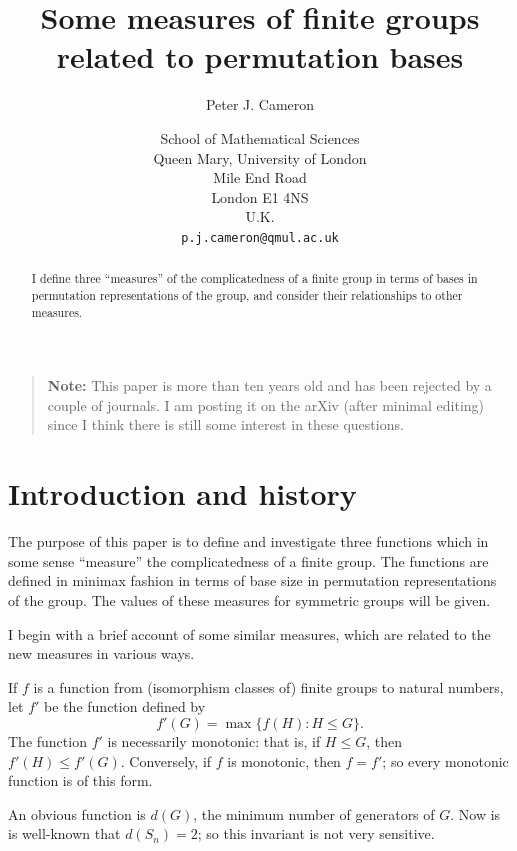 \documentclass[12pt]{article}
\begin{document}
\title{Some measures of finite groups related to permutation bases}
\author{Peter J. Cameron}
\date{School of Mathematical Sciences\\Queen Mary, University of London\\
Mile End Road\\London E1 4NS\\U.K.\\\texttt{p.j.cameron@qmul.ac.uk}}
\maketitle

\begin{quote}
\textbf{Note:} This paper is more than ten years old and has been rejected
by a couple of journals. I am posting it on the arXiv (after minimal editing)
since I think there is still some interest in these questions.
\end{quote}

\begin{abstract}
I define three ``measures'' of the complicatedness of a finite group in terms
of bases in permutation representations of the group, and consider their
relationships to other measures.
\end{abstract}

\section{Introduction and history}

The purpose of this paper is to define and investigate three functions which
in some sense ``measure'' the complicatedness of a finite group. The functions
are defined in minimax fashion in terms of base size in permutation
representations of the group. The values of these measures for symmetric
groups will be given.

I begin with a brief account of some similar measures, which are related to
the new measures in various ways.

If $f$ is a function from (isomorphism classes of) finite groups to natural
numbers, let $f'$ be the function defined by
\[f'(G)=\max\{f(H):H\le G\}.\]
The function $f'$ is necessarily monotonic: that is, if $H\le G$, then
$f'(H)\le f'(G)$. Conversely, if $f$ is monotonic, then $f=f'$; so every
monotonic function is of this form.

An obvious function is $d(G)$, the minimum number of generators of $G$.
Now is is well-known that $d(S_n)=2$; so this invariant is not very sensitive.
\end{document}
